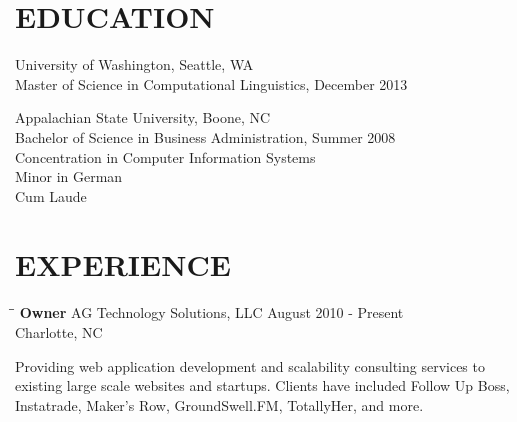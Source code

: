 \documentclass{res}
\begin{document}
\address{\large\bf  Anthony Gentile}
\address{6932 Loretta Place \\  Charlotte, NC 28215 \\  (704) 657-8550 \\ asgentile@gmail.com}

\begin{resume}

\section{EDUCATION}
    University of Washington, Seattle, WA  \\
    Master of Science in Computational Linguistics, December 2013

    Appalachian State University, Boone, NC  \\
    Bachelor of Science in Business Administration, Summer 2008   \\
    Concentration in Computer Information Systems       \\
    Minor in German  \\
    Cum Laude

\section{EXPERIENCE}
   \vspace{-0.1in}
   \begin{tabbing}
   \hspace{2.3in}\= \hspace{2.6in}\= \kill %
    {\bf Owner} \>AG Technology Solutions, LLC     \> August 2010 - Present\\
                             \>Charlotte, NC
   \end{tabbing}\vspace{-5pt}      %
    Providing web application development and scalability consulting services to existing large scale websites and startups. Clients have included Follow Up Boss, Instatrade, Maker's Row, GroundSwell.FM, TotallyHer, and more.


\end{resume}
\end{document}
